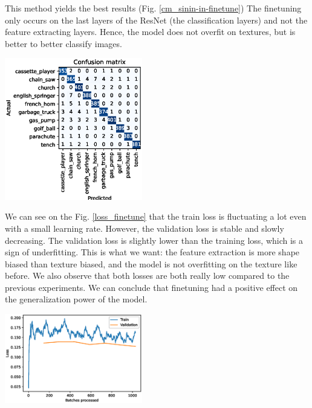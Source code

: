 \documentclass{article}
\begin{document}
This method yields the best results (Fig. \ref{cm_sinin-in-finetune}) The finetuning only occurs
on the last layers of the ResNet (the classification layers) and not the feature extracting layers.
Hence, the model does not overfit on textures, but is better to better classify images. \medskip \par

\begin{center}
  \captionsetup{type=figure}
  \includegraphics[width = 0.45\textwidth]{imgs/sinin/finetune/fine_tune_confusion_matrix_0.974.eps}
  \label{cm_sinin-in-finetune}
\end{center}

\noindent
We can see on the Fig. \ref{loss_finetune} that the train loss is fluctuating a lot even with a small
learning rate. However, the validation loss is stable and slowly decreasing.
The validation loss is slightly lower than the training loss, which is a sign of underfitting. This is what we want:
the feature extraction is more shape biased than texture biased, and the model is not overfitting on the texture like
before.
We also observe that both losses are both really low compared to the previous experiments. 
We can conclude that finetuning had a positive effect on the generalization power of the model.

\begin{center}
  \captionsetup{type=figure}
  \includegraphics[width = 0.45\textwidth]{imgs/sinin/finetune/loss.eps}
  \label{loss_finetune}
\end{center}
\end{document}
